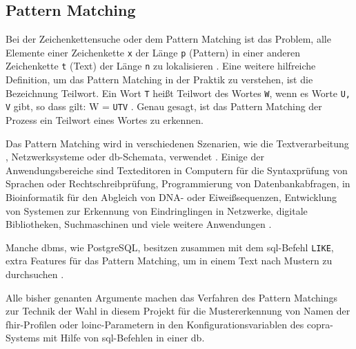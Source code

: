 \subsection{Pattern Matching} \label{subsec:pattmatch}

Bei der Zeichenkettensuche oder dem Pattern Matching ist das Problem, alle Elemente einer Zeichenkette \texttt{x} der Länge \texttt{p} (Pattern) in einer anderen Zeichenkette \texttt{t} (Text) der Länge \texttt{n} zu lokalisieren \cite{patternmatchingapostolico}. Eine weitere hilfreiche Definition, um das Pattern Matching in der Praktik zu verstehen, ist die Bezeichnung \glqq Teilwort\grqq{}. \glqq Ein Wort \texttt{T} heißt Teilwort des Wortes \texttt{W}, wenn es Worte \texttt{U, V} gibt, so dass gilt: W = \texttt{UTV}\grqq{} \cite{teilwort}. Genau gesagt, ist das Pattern Matching der Prozess ein Teilwort eines Wortes zu erkennen.

Das Pattern Matching wird in verschiedenen Szenarien, wie die Textverarbeitung \cite{patternmatchingeffi}, Netzwerksysteme oder \ac{db}-Schemata, verwendet \cite{patternmatchingapps}. Einige der Anwendungsbereiche sind Texteditoren in Computern für die Syntaxprüfung von Sprachen oder Rechtschreibprüfung, Programmierung von Datenbankabfragen, in Bioinformatik für den Abgleich von DNA- oder Eiweißsequenzen, Entwicklung von Systemen zur Erkennung von Eindringlingen in Netzwerke, digitale Bibliotheken, Suchmaschinen und viele weitere Anwendungen \cite{regexconf, patternmatchingapps}.

Manche \ac{dbms}, wie PostgreSQL, besitzen zusammen mit dem \ac{sql}-Befehl \glqq \texttt{LIKE}\grqq{}, extra Features für das Pattern Matching, um in einem Text nach Mustern zu durchsuchen \cite{patternmatchingpostgres}.

Alle bisher genanten Argumente machen das Verfahren des Pattern Matchings zur Technik der Wahl in diesem Projekt für die Mustererkennung von Namen der \ac{fhir}-Profilen oder \ac{loinc}-Parametern in den Konfigurationsvariablen des \ac{copra}-Systems mit Hilfe von \ac{sql}-Befehlen in einer \ac{db}.